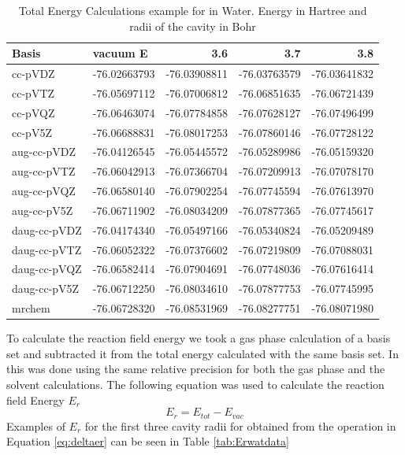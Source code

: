 \documentclass[../Thesis.tex]{subfiles}
\begin{document}
\begin{table}[htbp]
\caption[$E_{tot}$ for  in Water sample]{Total Energy Calculations example for  in Water. Energy in Hartree and radii of the cavity in Bohr}
\begin{tabular}{l|r|r|r|r}
Basis & \multicolumn{1}{l|}{vacuum E} & 3.6 & 3.7 & 3.8 \\ \hline
cc-pVDZ & -76.02663793 & -76.03908811 & -76.03763579 & -76.03641832 \\
cc-pVTZ & -76.05697112 & -76.07006812 & -76.06851635 & -76.06721439 \\
cc-pVQZ & -76.06463074 & -76.07784858 & -76.07628127 & -76.07496499 \\
cc-pV5Z & -76.06688831 & -76.08017253 & -76.07860146 & -76.07728122 \\ \hline
aug-cc-pVDZ & -76.04126545 & -76.05445572 & -76.05289986 & -76.05159320 \\
aug-cc-pVTZ & -76.06042913 & -76.07366704 & -76.07209913 & -76.07078170 \\
aug-cc-pVQZ & -76.06580140 & -76.07902254 & -76.07745594 & -76.07613970 \\
aug-cc-pV5Z & -76.06711902 & -76.08034209 & -76.07877365 & -76.07745617 \\ \hline
daug-cc-pVDZ & -76.04174340 & -76.05497166 & -76.05340824 & -76.05209489 \\
daug-cc-pVTZ & -76.06052322 & -76.07376602 & -76.07219809 & -76.07088031 \\
daug-cc-pVQZ & -76.06582414 & -76.07904691 & -76.07748036 & -76.07616414 \\
daug-cc-pV5Z & -76.06712250 & -76.08034610 & -76.07877753 & -76.07745995 \\ \hline
mrchem & -76.06728320 & -76.08531969 & -76.08277751 & -76.08071980 \\
\end{tabular}
\label{tab:rawwaterdata}
\end{table}


To calculate the reaction field energy we took a gas phase calculation
of a basis set and subtracted it from the total energy calculated with the same
basis set. In \mrchem this was done using the same relative precision for both
the gas phase and the solvent calculations. The following equation was used to
calculate the reaction field Energy $E_r$
\begin{equation}\label{eq:deltaer}
  E_r = E_{tot} - E_{vac}
\end{equation}
Examples of $E_r$ for the first three cavity radii for  obtained from the operation
in Equation \ref{eq:deltaer} can be seen in Table \ref{tab:Erwatdata}
\end{document}
